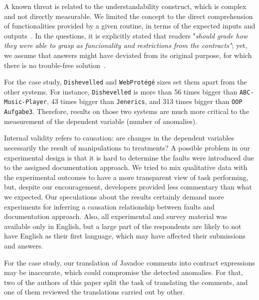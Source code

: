 A known threat is related to the understandability construct, which is complex and not directly measurable. We limited the concept to the direct comprehension of functionalities provided by a given routine, in terms of the expected inputs and outputs~\cite{4019969}. In the questions, it is explicitly stated that readers "\emph{should grade how they were able to grasp as funcionality and restrictions from the contracts"}; yet, we assume that answers might have deviated from its original purpose, for which there is no trouble-free solution~\cite{Scalabrino2017}.



For the case study, \texttt{Dishevelled} and
\texttt{WebProt\'{e}g\'{e}} sizes set them apart from the other systems.
For instance, \texttt{Dishevelled} is more than 56 times bigger than \texttt{ABC-Music-Player}, 43
times bigger than \texttt{Jenerics}, and 313 times bigger than \texttt{OOP Aufgabe3}.
Therefore, results on those two systems are much more critical to the measurement of the dependent variable (number of anomalies).


Internal validity refers to causation: are changes in the dependent variables necessarily the result of manipulations to treatments? A possible problem in our experimental design is that it is hard to determine the faults were introduced due to the assigned documentation approach. We tried to mix qualitative data with the experimental outcomes to have a more transparent view of task performing, but, despite our encouragement, developers provided less commentary than what we expected. Our speculations about the results certainly demand more experiments for inferring a causation relationship between faults and documentation approach.
Also, all experimental and survey material was available only in English, but a large part of the respondents are likely to not have English as their first language, which may have affected their
submissions and answers.

For the case study, our translation of Javadoc comments into contract expressions may be inaccurate, which could compromise the detected anomalies. For that, two of the authors of this paper split the task of translating the comments, and one of them reviewed the translations carried out by other. 



